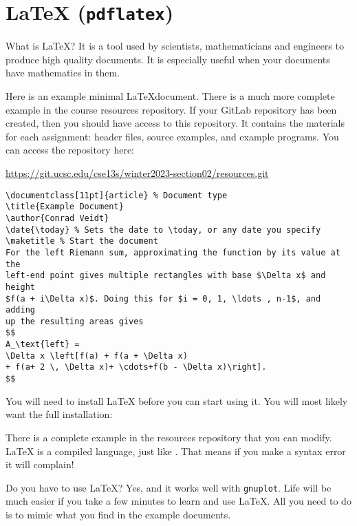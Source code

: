 \section{\LaTeX{} (\texttt{pdflatex})}

What is \LaTeX? It is a tool used by scientists, mathematicians and
engineers to produce high quality documents. It is especially
useful when your documents have mathematics in them.

Here is an example minimal \LaTeX document. There is a much more
complete example in the course resources repository. If your GitLab repository
has been created, then you should have access to this repository. It contains
the materials for each assignment: header files, source examples, and example
programs. You can access the repository here:

\vspace\baselineskip
\centerline{\url{https://git.ucsc.edu/cse13s/winter2023-section02/resources.git}}
\vspace\baselineskip

\begin{verbatim}
\documentclass[11pt]{article} % Document type
\title{Example Document}
\author{Conrad Veidt}
\date{\today} % Sets the date to \today, or any date you specify
\maketitle % Start the document
For the left Riemann sum, approximating the function by its value at the
left-end point gives multiple rectangles with base $\Delta x$ and height
$f(a + i\Delta x)$. Doing this for $i = 0, 1, \ldots , n-1$, and adding
up the resulting areas gives
$$
A_\text{left} =
\Delta x \left[f(a) + f(a + \Delta x)
+ f(a+ 2 \, \Delta x)+ \cdots+f(b - \Delta x)\right].
$$

\end{verbatim}

You will need to install \LaTeX{} before you can start using it. You will most
likely want the full installation:


There is a complete example in the resources repository that you can modify.
\LaTeX{} is a compiled language, just like \C{}. That means if you make a syntax
error it will complain!

Do you have to use \LaTeX? Yes, and it works well with \texttt{gnuplot}.
Life will be much easier if you take a few minutes to learn and use
\LaTeX{}. All you need to do is to mimic what you find in the example
documents.
